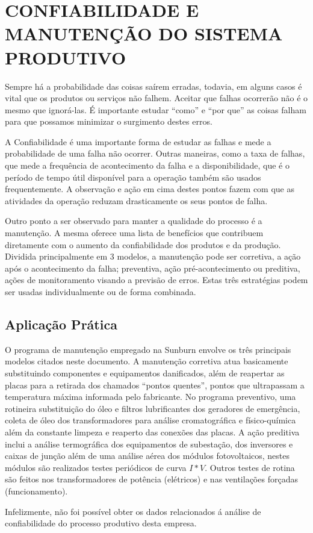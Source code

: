 \chapter{CONFIABILIDADE E MANUTENÇÃO DO SISTEMA PRODUTIVO}
\label{chap:confiabilidade_manutencao_do_sistema_produtivo}
Sempre há a probabilidade das coisas saírem erradas, todavia, em alguns casos é vital que os produtos ou serviços não falhem. Aceitar que falhas ocorrerão não é o mesmo que ignorá-las. É importante estudar ``como'' e ``por que'' as coisas falham para que possamos minimizar o surgimento destes erros.

A Confiabilidade é uma importante forma de estudar as falhas e mede a probabilidade de uma falha não ocorrer. Outras maneiras, como a taxa de falhas, que mede a frequência de acontecimento da falha e a disponibilidade, que é o período de tempo útil disponível para a operação também são usados frequentemente. A observação e ação em cima destes pontos fazem com que as atividades da operação reduzam drasticamente os seus pontos de falha.

Outro ponto a ser observado para manter a qualidade do processo é a manutenção. A mesma oferece uma lista de benefícios que contribuem diretamente com o aumento da confiabilidade dos produtos e da produção. Dividida principalmente em 3 modelos, a manutenção pode ser corretiva, a ação após o acontecimento da falha; preventiva, ação pré-acontecimento ou preditiva, ações de monitoramento visando a previsão de erros. Estas três estratégias podem ser usadas individualmente ou de forma combinada.


\section{Aplicação Prática}
\label{sec:confiabilidade_manutencao_aplicacao}

O programa de manutenção empregado na Sunburn envolve os três principais modelos citados neste documento. A manutenção corretiva atua basicamente substituindo componentes e equipamentos danificados, além de reapertar as placas para a retirada dos chamados ``pontos quentes'', pontos que ultrapassam a temperatura máxima informada pelo fabricante. No programa preventivo, uma rotineira substituição do óleo e filtros lubrificantes dos geradores de emergência, coleta de óleo dos transformadores para análise cromatográfica e físico-química além da constante limpeza e reaperto das conexões das placas. A ação preditiva inclui a análise termográfica dos equipamentos de subestação, dos inversores e caixas de junção além de uma análise aérea dos módulos fotovoltaicos, nestes módulos são realizados testes periódicos de curva $I * V$. Outros testes de rotina são feitos nos transformadores de potência (elétricos) e nas ventilações forçadas (funcionamento).

Infelizmente, não foi possível obter os dados relacionados á análise de confiabilidade do processo produtivo desta empresa.